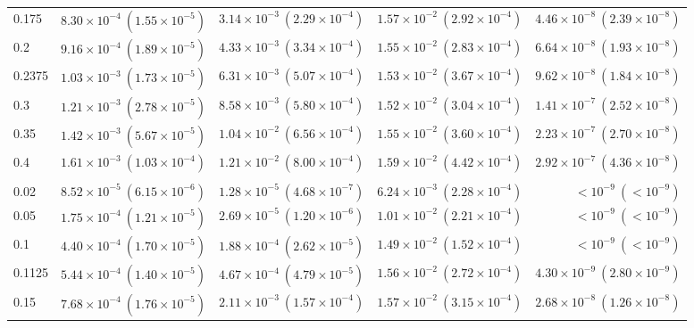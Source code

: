 \begin{table}[htbp]
\begin{tabular}{@{} l rrrr @{}}
0.175 & $8.30\!\times\!10^{-4}\ (1.55\!\times\!10^{-5})$ & $3.14\!\times\!10^{-3}\ (2.29\!\times\!10^{-4})$ & $1.57\!\times\!10^{-2}\ (2.92\!\times\!10^{-4})$ & $4.46\!\times\!10^{-8}\ (2.39\!\times\!10^{-8})$ \\
0.2 & $9.16\!\times\!10^{-4}\ (1.89\!\times\!10^{-5})$ & $4.33\!\times\!10^{-3}\ (3.34\!\times\!10^{-4})$ & $1.55\!\times\!10^{-2}\ (2.83\!\times\!10^{-4})$ & $6.64\!\times\!10^{-8}\ (1.93\!\times\!10^{-8})$ \\
0.2375 & $1.03\!\times\!10^{-3}\ (1.73\!\times\!10^{-5})$ & $6.31\!\times\!10^{-3}\ (5.07\!\times\!10^{-4})$ & $1.53\!\times\!10^{-2}\ (3.67\!\times\!10^{-4})$ & $9.62\!\times\!10^{-8}\ (1.84\!\times\!10^{-8})$ \\
0.3 & $1.21\!\times\!10^{-3}\ (2.78\!\times\!10^{-5})$ & $8.58\!\times\!10^{-3}\ (5.80\!\times\!10^{-4})$ & $1.52\!\times\!10^{-2}\ (3.04\!\times\!10^{-4})$ & $1.41\!\times\!10^{-7}\ (2.52\!\times\!10^{-8})$ \\
0.35 & $1.42\!\times\!10^{-3}\ (5.67\!\times\!10^{-5})$ & $1.04\!\times\!10^{-2}\ (6.56\!\times\!10^{-4})$ & $1.55\!\times\!10^{-2}\ (3.60\!\times\!10^{-4})$ & $2.23\!\times\!10^{-7}\ (2.70\!\times\!10^{-8})$ \\
0.4 & $1.61\!\times\!10^{-3}\ (1.03\!\times\!10^{-4})$ & $1.21\!\times\!10^{-2}\ (8.00\!\times\!10^{-4})$ & $1.59\!\times\!10^{-2}\ (4.42\!\times\!10^{-4})$ & $2.92\!\times\!10^{-7}\ (4.36\!\times\!10^{-8})$ \\
\addlinespace
\multicolumn{5}{@{}l}{\textit{Wide ($p \sim \mathcal{U}(0.05, 0.3)$)}} \\
0.02 & $8.52\!\times\!10^{-5}\ (6.15\!\times\!10^{-6})$ & $1.28\!\times\!10^{-5}\ (4.68\!\times\!10^{-7})$ & $6.24\!\times\!10^{-3}\ (2.28\!\times\!10^{-4})$ & $<\!10^{-9}\ (<\!10^{-9})$ \\
0.05 & $1.75\!\times\!10^{-4}\ (1.21\!\times\!10^{-5})$ & $2.69\!\times\!10^{-5}\ (1.20\!\times\!10^{-6})$ & $1.01\!\times\!10^{-2}\ (2.21\!\times\!10^{-4})$ & $<\!10^{-9}\ (<\!10^{-9})$ \\
0.1 & $4.40\!\times\!10^{-4}\ (1.70\!\times\!10^{-5})$ & $1.88\!\times\!10^{-4}\ (2.62\!\times\!10^{-5})$ & $1.49\!\times\!10^{-2}\ (1.52\!\times\!10^{-4})$ & $<\!10^{-9}\ (<\!10^{-9})$ \\
0.1125 & $5.44\!\times\!10^{-4}\ (1.40\!\times\!10^{-5})$ & $4.67\!\times\!10^{-4}\ (4.79\!\times\!10^{-5})$ & $1.56\!\times\!10^{-2}\ (2.72\!\times\!10^{-4})$ & $4.30\!\times\!10^{-9}\ (2.80\!\times\!10^{-9})$ \\
0.15 & $7.68\!\times\!10^{-4}\ (1.76\!\times\!10^{-5})$ & $2.11\!\times\!10^{-3}\ (1.57\!\times\!10^{-4})$ & $1.57\!\times\!10^{-2}\ (3.15\!\times\!10^{-4})$ & $2.68\!\times\!10^{-8}\ (1.26\!\times\!10^{-8})$ \\

\end{tabular}
\end{table}
